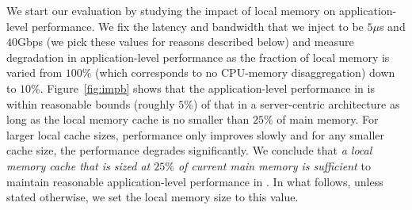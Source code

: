 We start our evaluation by studying the impact of local memory on application-level performance.
We fix the latency and bandwidth that we inject to be $5\mu$s and $40$Gbps (we pick these values for reasons described below) and measure degradation in application-level performance as the fraction of local memory is varied from $100\%$ (which corresponds to no CPU-memory disaggregation) down to $10\%$.
Figure~\ref{fig:impb} shows that the application-level performance in \dis is within reasonable bounds (roughly $5$\%) of that in a server-centric architecture as long as the local memory cache is no smaller than $25\%$ of main memory. For larger local cache sizes, performance only improves slowly and for any smaller cache size, the performance degrades significantly. 
We conclude that \emph{a local memory cache that is sized at $25\%$ of current main memory is sufficient} to maintain reasonable application-level performance in \dis. In what follows, unless stated otherwise, we set the local memory size to this value.

